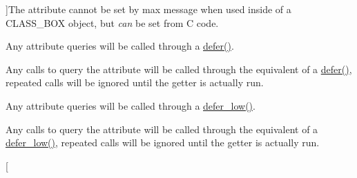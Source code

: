 \begin{Desc}
\begin{description}
{}]The attribute cannot be set by max message when used inside of a CLASS\_\-BOX object, but {\itshape can\/} be set from C code. \item[{\em 
\hypertarget{group__attr_ggaf296cfc6741bb19207f6ed8062809115a4c62cd34ebba601f635f8998d2e8bd00}{
ATTR\_\-GET\_\-DEFER}
\label{group__attr_ggaf296cfc6741bb19207f6ed8062809115a4c62cd34ebba601f635f8998d2e8bd00}
}]Any attribute queries will be called through a \hyperlink{group__threading_gaa24a0c9896f1ad241e45590065c3f643}{defer()}. \item[{\em 
\hypertarget{group__attr_ggaf296cfc6741bb19207f6ed8062809115a6f621b7aed25b0a4489fb99d618075de}{
ATTR\_\-GET\_\-USURP}
\label{group__attr_ggaf296cfc6741bb19207f6ed8062809115a6f621b7aed25b0a4489fb99d618075de}
}]Any calls to query the attribute will be called through the equivalent of a \hyperlink{group__threading_gaa24a0c9896f1ad241e45590065c3f643}{defer()}, repeated calls will be ignored until the getter is actually run. \item[{\em 
\hypertarget{group__attr_ggaf296cfc6741bb19207f6ed8062809115af657afba5a7b08438980788cc0dba02c}{
ATTR\_\-GET\_\-DEFER\_\-LOW}
\label{group__attr_ggaf296cfc6741bb19207f6ed8062809115af657afba5a7b08438980788cc0dba02c}
}]Any attribute queries will be called through a \hyperlink{group__threading_ga486daa40ddb16f70b663615695d18315}{defer\_\-low()}. \item[{\em 
\hypertarget{group__attr_ggaf296cfc6741bb19207f6ed8062809115ad3791455a3bd775f02ed5b571a394f44}{
ATTR\_\-GET\_\-USURP\_\-LOW}
\label{group__attr_ggaf296cfc6741bb19207f6ed8062809115ad3791455a3bd775f02ed5b571a394f44}
}]Any calls to query the attribute will be called through the equivalent of a \hyperlink{group__threading_ga486daa40ddb16f70b663615695d18315}{defer\_\-low()}, repeated calls will be ignored until the getter is actually run. \item[{\em 
}
\end{description}
\end{Desc}
